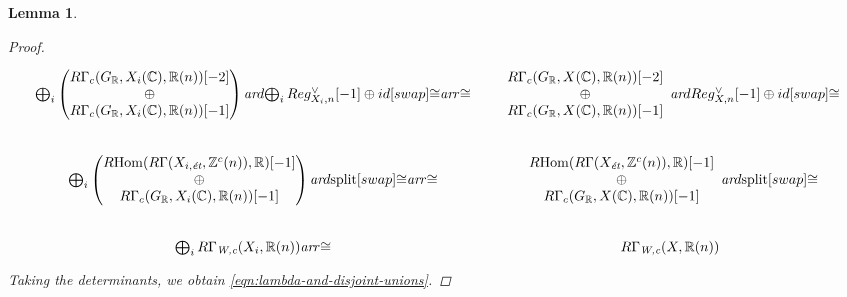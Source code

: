 \documentclass[10pt,a4paper,oneside,draft]{article}
\DeclareMathOperator{\Hom}{Hom}
\newcommand{\CC}{\mathbb{C}}
\newcommand{\RR}{\mathbb{R}}
\newcommand{\ZZ}{\mathbb{Z}}
\newcommand{\ar}{\text{\it ar}}
\newcommand{\et}{\text{\it \'{e}t}}
\newcommand{\Wc}{\text{\it W,c}}
\newcommand{\RHom}{R\!\Hom}
\theoremstyle{myplain}
\newtheorem{lemma}[theorem]{Lemma}
\theoremstyle{mydefinition}
\numberwithin{equation}{section}
\begin{document}
\begin{lemma}
\begin{proof}
    \[ \begin{tikzcd}[column sep=1.25em]
        \bigoplus_i \left(\!\!\!\begin{array}{c} R\Gamma_c (G_\RR, X_i (\CC), \RR (n)) [-2] \\ \oplus \\ R\Gamma_c (G_\RR, X_i (\CC), \RR (n)) [-1] \end{array}\!\!\!\right) \ar{d}{\bigoplus_i Reg_{X_i,n}^\vee [-1] \oplus id}[swap]{\cong} \ar{r}{\cong} & \begin{array}{c} R\Gamma_c (G_\RR, X (\CC), \RR (n)) [-2] \\ \oplus \\ R\Gamma_c (G_\RR, X (\CC), \RR (n)) [-1] \end{array} \ar{d}{Reg_{X,n}^\vee [-1] \oplus id}[swap]{\cong} \\
        \bigoplus_i \left(\!\!\!\begin{array}{c} \RHom (R\Gamma (X_{i,\et}, \ZZ^c (n)), \RR) [-1] \\ \oplus \\ R\Gamma_c (G_\RR, X_i (\CC), \RR (n)) [-1] \end{array}\!\!\!\right) \ar{d}{\text{split}}[swap]{\cong} \ar{r}{\cong} & \begin{array}{c} \RHom (R\Gamma (X_\et, \ZZ^c (n)), \RR) [-1] \\ \oplus \\ R\Gamma_c (G_\RR, X (\CC), \RR (n)) [-1] \end{array} \ar{d}{\text{split}}[swap]{\cong} \\
        \bigoplus_i R\Gamma_\Wc (X_i, \RR (n)) \ar{r}{\cong} & R\Gamma_\Wc (X, \RR (n))
      \end{tikzcd} \]
    Taking the determinants, we obtain \eqref{eqn:lambda-and-disjoint-unions}.
  \end{proof}
\end{lemma}
\end{document}
